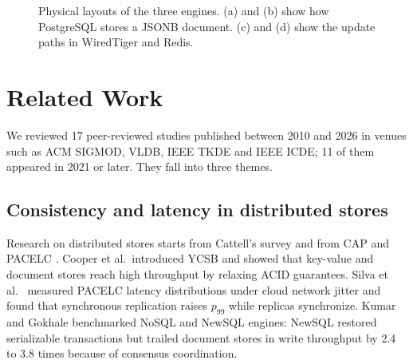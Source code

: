 \documentclass[conference,a4paper]{IEEEtran}
\begin{document}
\begin{figure}[t]
\caption{Physical layouts of the three engines. (a) and (b) show how PostgreSQL stores a JSONB document. (c) and (d) show the update paths in WiredTiger and Redis.}
\label{fig:layouts}
\end{figure}

\section{Related Work}
We reviewed 17 peer-reviewed studies published between 2010 and 2026 in venues such as ACM SIGMOD, VLDB, IEEE TKDE and IEEE ICDE; 11 of them appeared in 2021 or later. They fall into three themes.

\subsection{Consistency and latency in distributed stores}
Research on distributed stores starts from Cattell's survey \cite{cattell2010} and from CAP and PACELC \cite{brewer2012,abadi2012}. Cooper et al.\ introduced YCSB \cite{cooper2010} and showed that key-value and document stores reach high throughput by relaxing ACID guarantees. Silva et al.\ \cite{silva2025} measured PACELC latency distributions under cloud network jitter and found that synchronous replication raises $p_{99}$ while replicas synchronize. Kumar and Gokhale \cite{kumar2023} benchmarked NoSQL and NewSQL engines: NewSQL restored serializable transactions but trailed document stores in write throughput by 2.4 to 3.8 times because of consensus coordination.
\end{document}
